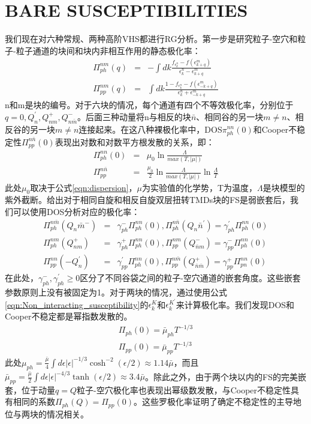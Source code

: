 \documentclass[reprint, aps, prb, showkeys]{revtex4-2}
\begin{document}
\section{BARE SUSCEPTIBILITIES}
我们现在对六种常规、两种高阶VHS都进行RG分析。第一步是研究粒子-空穴和粒子-粒子通道的块间和块内非相互作用的静态极化率：
\begin{eqnarray}
    \Pi_{ph}^{nm}(q) &=& -\int dk \frac{f_{\epsilon_k^n} - f({\epsilon_{k+q}^m})}{\epsilon_k^n - \epsilon_{k+q}^m} \nonumber \\
    \Pi_{pp}^{nm}(q) &=& \int dk \frac{1 - f_{\epsilon_k^n} - f({\epsilon_{-k+q}^m})}{\epsilon_k^n + \epsilon_{-k+q}^m} \label{eqn:Non_interacting_susceptibility}
\end{eqnarray}
n和m是块的编号。对于六块的情况，每个通道有四个不等效极化率，分别位于$q = 0, Q_n^{'}, Q_{nm}^{+}, Q_{n\bar{m}}^{-}$。后面三种动量将n与相反的块$\bar{n}$、相同谷的另一块$m \neq n$、相反谷的另一块$m \neq n$连接起来。在这八种裸极化率中，DOS$\pi_{ph}^{nn}(0)$和Cooper不稳定性$\Pi_{pp}^{n\bar{n}}(0)$表现出对数和对数平方根发散的关系，即：
\begin{eqnarray}
    \Pi_{ph}^{nn}(0) &=& \mu_0 \ln \frac{\Lambda}{max(T, |\mu|)} \nonumber \\
    \Pi_{pp}^{n\bar{n}} &=& \frac{\mu_0}{2} \ln \frac{\Lambda}{max(T, |\mu|)} \ln \frac{\Lambda}{T}
\end{eqnarray}
此处$\mu_0$取决于公式\ref{eqn:dispersion}，$\mu$为实验值的化学势，T为温度，$\Lambda$是块模型的紫外截断。给出对于相同自旋和相反自旋双层扭转TMDs块的FS是弱嵌套后，我们可以使用DOS分析对应的极化率：
\begin{eqnarray}
    \Pi_{ph}^{n\bar{m}}(Q_n\bar{m}^{-}) &=& \gamma_{ph}^{-}\Pi_{ph}^{nn}(0), \Pi_{ph}^{n\bar{n}}(Q_n\bar{n}^{'}) = \gamma_{ph}^{'}\Pi_{ph}^{nn}(0) \nonumber \\
    \Pi_{ph}^{nm}(Q_{nm}^{+}) &=& \gamma_{ph}^{+}\Pi_{ph}^{nn}(0), \Pi_{pp}^{nm}(Q_{\bar{n}m}^{-}) = \gamma_{pp}^{-}\Pi_{ph}^{nn}(0) \nonumber \\
    \Pi_{pp}^{nn}(-Q_n^{'}) &=& \gamma_{pp}^{'}\Pi_{ph}^{nn}(0), \Pi_{pp}^{n\bar{m}}(Q_{\bar{n}\bar{m}}^{+}) = \gamma_{pp}^{+}\Pi_{pn}^{nn}(0)
\end{eqnarray}
在此处，$\gamma_{ph}^{-}, \gamma_{ph}^{'} \ge 0$区分了不同谷袋之间的粒子-空穴通道的嵌套角度。这些嵌套参数原则上没有被固定为1。对于两块的情况，通过使用公式\ref{eqn:Non_interacting_susceptibility}的$\epsilon_k^K$和$\epsilon_k^{K^{'}}$来计算极化率。我们发现DOS和Cooper不稳定都是幂指数发散的。
\begin{eqnarray}
    \Pi_{ph}(0) = \bar{\mu}_{ph} T^{-1/3} \nonumber \\
    \Pi_{pp}(0) = \bar{\mu}_{pp} T^{-1/3}
\end{eqnarray}
此处$\mu_{ph} = \frac{\bar{\mu}}{4} \int d\epsilon |\epsilon|^{-1/3} \cosh ^{-2} (\epsilon/2) \approx 1.14 \bar{\mu}$，而且$\bar{\mu}_{pp} = \frac{\bar{\mu}}{2} \int d\epsilon | \epsilon |^{-4/3} \tanh(\epsilon/2) \approx 3.4 \bar{\mu}$。除此之外，由于两个块以内的FS的完美嵌套，位于动量$q = Q$粒子-空穴极化率也表现出幂级数发散，与Cooper不稳定性具有相同的系数$\Pi_{ph}(Q) = \Pi_{pp}(0)$。这些罗极化率证明了确定不稳定性的主导地位与两块的情况相关。
\end{document}

